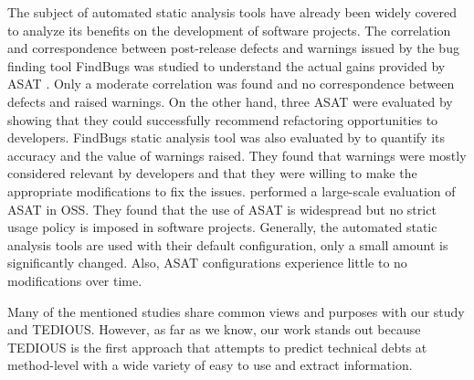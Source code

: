 The subject of automated static analysis tools have already been widely covered to analyze its benefits on the development of software projects. The correlation and correspondence between post-release defects and warnings issued by the bug finding tool FindBugs was studied to understand the actual gains provided by \ac{ASAT} \citep{couto2013static}. Only a moderate correlation was found and no correspondence between defects and raised warnings. On the other hand, three \ac{ASAT} were evaluated by \citet{wedyan2009effectiveness} showing that they could successfully recommend refactoring opportunities to developers. FindBugs static analysis tool was also evaluated by \citet{ayewah2007evaluating} to quantify its accuracy and the value of warnings raised. They found that warnings were mostly considered relevant by developers and that they were willing to make the appropriate modifications to fix the issues. \citet{BellerBMZ16} performed a large-scale evaluation of \ac{ASAT} in \ac{OSS}. They found that the use of \ac{ASAT} is widespread but no strict usage policy is imposed in software projects. Generally, the automated static analysis tools are used with their default configuration, only a small amount is significantly changed. Also, \ac{ASAT} configurations experience little to no modifications over time. \par 

Many of the mentioned studies share common views and purposes with our study and \ac{TEDIOUS}. However, as far as we know, our work stands out because \ac{TEDIOUS} is the first approach that attempts to predict technical debts at method-level with a wide variety of easy to use and extract information.













